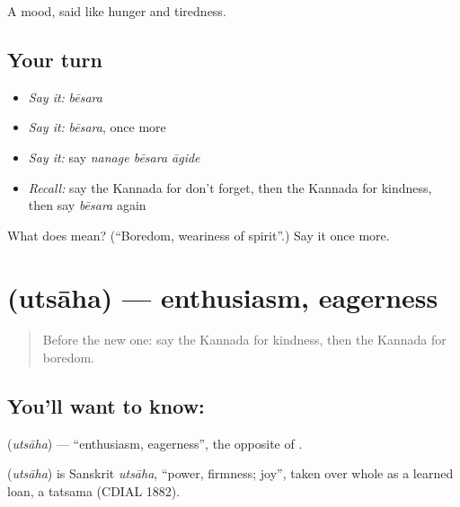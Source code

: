 \begin{grammarlens}[title={What you've built}]
A mood, said like hunger and tiredness.
\end{grammarlens}

\subsection*{Your turn}
\begin{itemize}
\raggedright
  \item \emph{Say it:} \emph{bēsara}
  \item \emph{Say it:} \emph{bēsara}, once more
  \item \emph{Say it:} say \emph{nanage bēsara āgide}
  \item \emph{Recall:} say the Kannada for don't forget, then the Kannada for kindness, then say \emph{bēsara} again
\end{itemize}

\begin{tcolorbox}[breakable,colback=teal!4,colframe=teal!35!black,title={Before you move on}]
What does  mean? (\textquotedblleft{}Boredom, weariness of spirit\textquotedblright{}.) Say it once more.
\end{tcolorbox}
\section[\texorpdfstring{\kn{ಉತ್ಸಾಹ} (utsāha)}{ಉತ್ಸಾಹ (utsāha)}]{ (utsāha) — enthusiasm, eagerness}

\label{lesson:KA-C98-enthusiasm}



\begin{quote}
Before the new one: say the Kannada for kindness, then the Kannada for boredom.
\end{quote}

\subsection*{You'll want to know: }
\textbf{} (\emph{utsāha}) — \textquotedblleft{}enthusiasm, eagerness\textquotedblright{}, the opposite of \textbf{}.

\begin{cousinweb}
\textbf{} (\emph{utsāha}) is Sanskrit \emph{utsāha}, \textquotedblleft{}power, firmness; joy\textquotedblright{}, taken over whole as a learned loan, a tatsama (CDIAL 1882).
\end{cousinweb}

